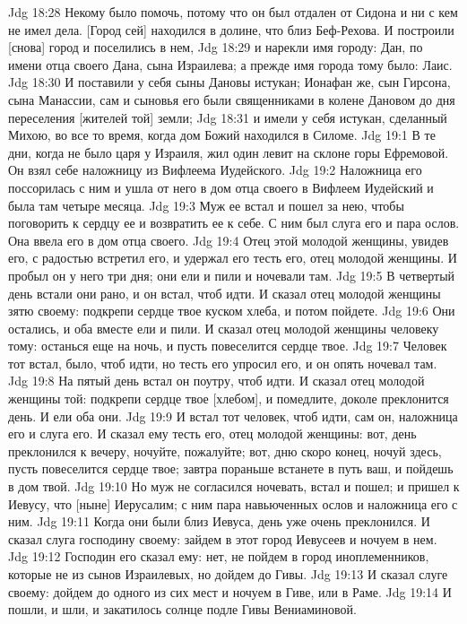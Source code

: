Jdg 18:28  Некому было помочь, потому что он был отдален от Сидона и ни с кем не имел дела. [Город сей] находился в долине, что близ Беф-Рехова. И построили [снова] город и поселились в нем,
Jdg 18:29  и нарекли имя городу: Дан, по имени отца своего Дана, сына Израилева; а прежде имя города тому было: Лаис.
Jdg 18:30  И поставили у себя сыны Дановы истукан; Ионафан же, сын Гирсона, сына Манассии, сам и сыновья его были священниками в колене Дановом до дня переселения [жителей той] земли;
Jdg 18:31  и имели у себя истукан, сделанный Михою, во все то время, когда дом Божий находился в Силоме.
Jdg 19:1  В те дни, когда не было царя у Израиля, жил один левит на склоне горы Ефремовой. Он взял себе наложницу из Вифлеема Иудейского.
Jdg 19:2  Наложница его поссорилась с ним и ушла от него в дом отца своего в Вифлеем Иудейский и была там четыре месяца.
Jdg 19:3  Муж ее встал и пошел за нею, чтобы поговорить к сердцу ее и возвратить ее к себе. С ним был слуга его и пара ослов. Она ввела его в дом отца своего.
Jdg 19:4  Отец этой молодой женщины, увидев его, с радостью встретил его, и удержал его тесть его, отец молодой женщины. И пробыл он у него три дня; они ели и пили и ночевали там.
Jdg 19:5  В четвертый день встали они рано, и он встал, чтоб идти. И сказал отец молодой женщины зятю своему: подкрепи сердце твое куском хлеба, и потом пойдете.
Jdg 19:6  Они остались, и оба вместе ели и пили. И сказал отец молодой женщины человеку тому: останься еще на ночь, и пусть повеселится сердце твое.
Jdg 19:7  Человек тот встал, было, чтоб идти, но тесть его упросил его, и он опять ночевал там.
Jdg 19:8  На пятый день встал он поутру, чтоб идти. И сказал отец молодой женщины той: подкрепи сердце твое [хлебом], и помедлите, доколе преклонится день. И ели оба они.
Jdg 19:9  И встал тот человек, чтоб идти, сам он, наложница его и слуга его. И сказал ему тесть его, отец молодой женщины: вот, день преклонился к вечеру, ночуйте, пожалуйте; вот, дню скоро конец, ночуй здесь, пусть повеселится сердце твое; завтра пораньше встанете в путь ваш, и пойдешь в дом твой.
Jdg 19:10  Но муж не согласился ночевать, встал и пошел; и пришел к Иевусу, что [ныне] Иерусалим; с ним пара навьюченных ослов и наложница его с ним.
Jdg 19:11  Когда они были близ Иевуса, день уже очень преклонился. И сказал слуга господину своему: зайдем в этот город Иевусеев и ночуем в нем.
Jdg 19:12  Господин его сказал ему: нет, не пойдем в город иноплеменников, которые не из сынов Израилевых, но дойдем до Гивы.
Jdg 19:13  И сказал слуге своему: дойдем до одного из сих мест и ночуем в Гиве, или в Раме.
Jdg 19:14  И пошли, и шли, и закатилось солнце подле Гивы Вениаминовой.

